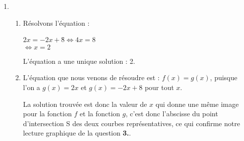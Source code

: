 \begin{enumerate}[start=4]
	\item \begin{enumerate}
		\item Résolvons l'équation :
		
		\begin{tabbing}
			$2x = -2x + 8$\=$\iff 4x = 8$\\
			\>$\iff x= 2$
		\end{tabbing}
		
L'équation a une unique solution : 2.
		
		\item L'équation que nous venons de résoudre est : $f(x)=g(x)$, puisque l'on a $g(x) = 2x$ et $g(x)=-2x+8$ pour tout $x$.
		
La solution trouvée est donc la valeur de $x$ qui donne une même image pour la fonction $f$ et la fonction $g$, c'est donc l'abscisse du point d'intersection S des deux courbes représentatives, ce qui confirme notre lecture graphique de la question \textbf{3.}.
	\end{enumerate}
\end{enumerate}

\vspace{0,5cm}


